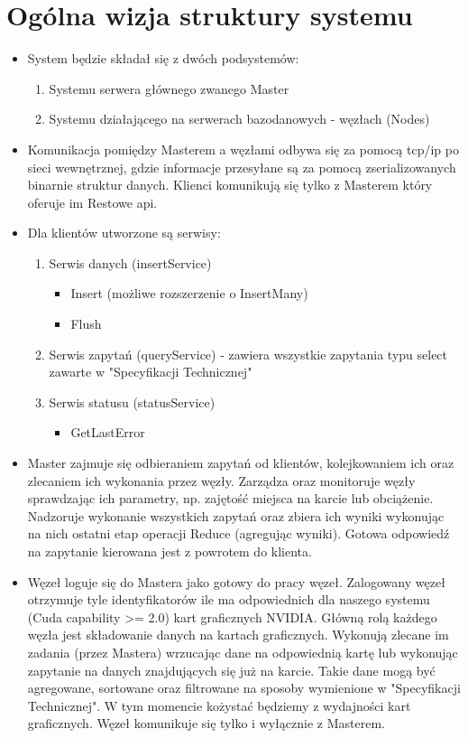 \documentclass[paper=a4, fontsize=11pt]{scrartcl} %
\numberwithin{equation}{section} %
\numberwithin{figure}{section} %
\numberwithin{table}{section} %
\begin{document}
\section{Ogólna wizja struktury systemu}
\begin{itemize}
	\item System będzie składał się z dwóch podsystemów:
		\begin{enumerate}
			\item Systemu serwera głównego zwanego Master
			\item Systemu działającego na serwerach bazodanowych - węzłach (Nodes)
		\end{enumerate}
	\item Komunikacja pomiędzy Masterem a węzłami odbywa się za pomocą tcp/ip po sieci wewnętrznej, gdzie informacje przesyłane są za pomocą 
		zserializowanych binarnie struktur danych. Klienci komunikują się tylko z Masterem który oferuje im Restowe api. 
	\item Dla klientów utworzone są serwisy:
		\begin{enumerate}
			\item Serwis danych (insertService)
				\begin{itemize}
					\item Insert (możliwe rozszerzenie o InsertMany)
					\item Flush
				\end{itemize}
			\item Serwis zapytań (queryService) - zawiera wszystkie zapytania typu select zawarte w "Specyfikacji Technicznej"
			\item Serwis statusu (statusService)
				\begin{itemize}
					\item GetLastError
				\end{itemize}
		\end{enumerate}
	\item Master zajmuje się odbieraniem zapytań od klientów, kolejkowaniem ich oraz zlecaniem ich wykonania przez węzły. Zarządza oraz monitoruje 
		węzły sprawdzając ich parametry, np. zajętość miejsca na karcie lub obciążenie. Nadzoruje wykonanie wszystkich zapytań oraz zbiera ich wyniki 
		wykonując na nich ostatni etap operacji Reduce (agregując wyniki). Gotowa odpowiedź na zapytanie kierowana jest z powrotem do klienta.
	\item Węzeł loguje się do Mastera jako gotowy do pracy węzeł. Zalogowany węzeł otrzymuje tyle identyfikatorów ile ma odpowiednich dla naszego systemu 
		(Cuda capability >= 2.0) kart graficznych NVIDIA. Główną rolą każdego węzła jest składowanie danych na kartach graficznych. Wykonują zlecane im 
		zadania (przez Mastera) wrzucając dane na odpowiednią kartę lub wykonując zapytanie na danych znajdujących się już na karcie. Takie dane mogą 
		być agregowane, sortowane oraz filtrowane na sposoby wymienione w "Specyfikacji Technicznej". W tym momencie kożystać będziemy z wydajności 
		kart graficznych. Węzeł komunikuje się tylko i wyłącznie z Masterem.
\end{itemize}
\end{document}
